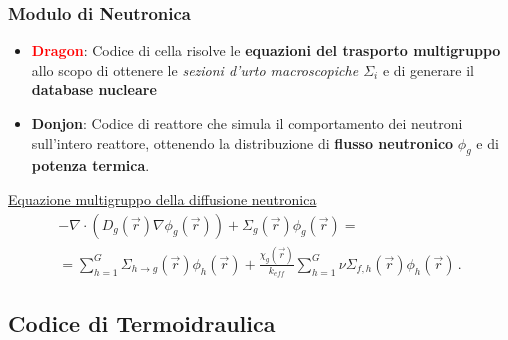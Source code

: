 \begin{frame}
 \frametitle{Modulo di Neutronica}
 
 \begin{center} \vspace{0.2cm} 
 \begin{block}{}
   \begin{itemize}
     \item \textbf{\textcolor{red}{Dragon}}: Codice di cella risolve le \textbf{equazioni del trasporto multigruppo} 
     allo scopo
     di ottenere le \textit{sezioni d'urto macroscopiche $\Sigma_i$}  e di generare il \textbf{database nucleare}
   \end{itemize}
   \end{block}
   \begin{block}{}
   \begin{itemize}
    \item \textbf{\textcolor{bleudefrance}{Donjon}}: Codice di reattore che simula il comportamento dei neutroni sull'intero
          reattore, ottenendo la distribuzione di \textbf{flusso neutronico} $\phi_g$ e di \textbf{potenza termica}. 
      \end{itemize}	  
  \end{block}

   \underline{Equazione multigruppo della diffusione neutronica}
\begin{multline*}
 -\nabla \cdot(D_g(\vec{r})\nabla \phi_g(\vec{r}))+\Sigma_g(\vec{r})\phi_g(\vec{r})=\\
 =\sum_{h=1}^G \Sigma_{h \rightarrow g}(\vec{r}) 
\phi_h(\vec{r})+\frac{\chi_g(\vec{r})}{k_{eff}} \sum_{h=1}^G \nu 
\Sigma_{f,h}(\vec{r})\phi_h(\vec{r})   \,.
\end{multline*}
  \end{center}

  \end{frame}
 
 \subsection{Codice di Termoidraulica}
 
